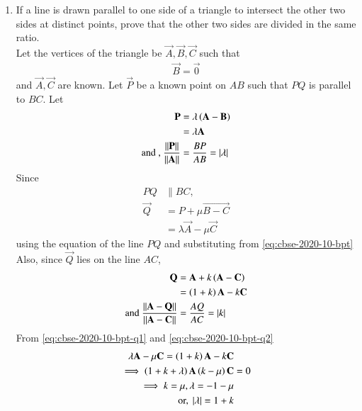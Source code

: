 \documentclass[journal,12pt,twocolumn]{IEEEtran}
\renewcommand\thesection{\arabic{section}}
\begin{document}
\begin{enumerate}[label=\thesection.\arabic*.,ref=\thesection.\theenumi]
\begin{figure}
	  \caption{}
	  \label{fig:matrix-10-9.pdf}
	  \end{figure}
    \item If a line is drawn parallel to one side of a triangle to intersect the other two sides at distinct points, prove that the other two sides are divided in the same ratio.\\
	    \solution Let the vertices of the triangle be $\vec{A}, \vec{B}, \vec{C}$ such that  
		\begin{align}
			\vec{B} =\vec{0} 
		\end{align}
		and $\vec{A}, \vec{C}$ are known. Let $\vec{P}$ be a known point on $AB$ such that $PQ$ is parallel to $BC$.  Let 
		\begin{align}
			\mathbf{P} &= \lambda \left(\mathbf{A} -\mathbf{B} \right)
			\\
			&=\lambda 
			 \mathbf{A} 
			\label{eq:cbse-2020-10-bpt}
			\\
			\text{and , } \frac{\left\lVert\mathbf{P} 
			\right\rVert}{\left\lVert\mathbf{A}\right\rVert } &= \frac{BP}{AB}= \left\vert\lambda\right\vert
			\label{eq:cbse-2020-10-bpt-pa}
		\end{align}
		Since 
		\begin{align}
			PQ &\parallel BC,
			\\
			\vec{Q} &= P + \mu \vec{B-C}
			\\
			&= \lambda \vec{A} - \mu \vec{C}
			\label{eq:cbse-2020-10-bpt-q1}
		\end{align}
		using the equation of the line $PQ$  and substituting from 
			\eqref{eq:cbse-2020-10-bpt}
			Also, since $\vec{Q}$  lies on the line $AC$, 
		\begin{align}
			\mathbf{Q} &= \mathbf{A} + k \left(\mathbf{A}-\mathbf{C}\right)
			\\
			&= \left(1 + k\right)\mathbf{A} - k \mathbf{C}
			\label{eq:cbse-2020-10-bpt-q2}
			\\
			\text{and }\frac{\left\lVert{\mathbf{A}-\mathbf{Q}}\right\rVert}{\left\lVert{\mathbf{A}-\mathbf{C}}\right\rVert} &= \frac{AQ}{AC}= \left\vert k\right\vert
			\label{eq:cbse-2020-10-bpt-q2k}
		\end{align}
			From \eqref{eq:cbse-2020-10-bpt-q1} and 
			\eqref{eq:cbse-2020-10-bpt-q2}
		\begin{align}
			\lambda \vec{A} - \mu \vec{C}	= 
			 \brak{1 + k}\vec{A} - k \vec{C}&
			\\
			\implies 
			\brak{1 + k+\lambda }\vec{A} \brak{k - \mu}  \vec{C}	&=  0
			\\
			\implies k = \mu, \lambda = -1 - \mu 
			\\
			\text{or, } \abs{\lambda } = 1 + k
			\label{eq:cbse-2020-10-bpt-q2-lk}

\end{align}
\end{enumerate}
\end{document}
